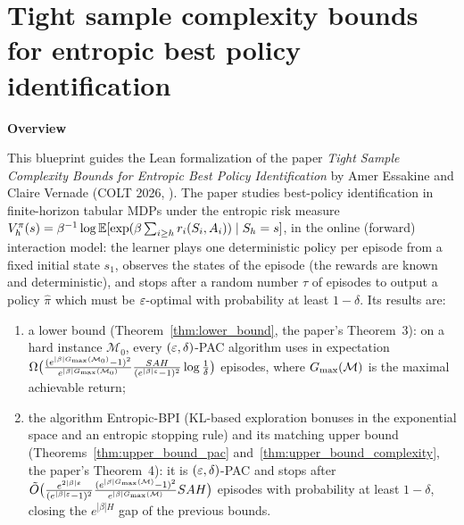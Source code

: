 %

\part{Tight sample complexity bounds for entropic best policy identification}
\label{part:main}

\textbf{Overview}

This blueprint guides the Lean formalization of the paper
\emph{Tight Sample Complexity Bounds for Entropic Best Policy Identification} by Amer Essakine
and Claire Vernade (COLT 2026, \cite{essakine2026tight}). The paper studies best-policy
identification in finite-horizon tabular MDPs under the entropic risk measure
$V^\pi_h(s) = \beta^{-1}\log \mathbb{E}[\exp(\beta \sum_{i \ge h} r_i(S_i, A_i)) \mid S_h = s]$, in the
online (forward) interaction model: the learner plays one deterministic policy per episode from
a fixed initial state $s_1$, observes the states of the episode (the rewards are known and
deterministic), and stops after a random number $\tau$ of episodes to output a policy
$\hat\pi$ which must be $\varepsilon$-optimal with probability at least $1 - \delta$. Its results are:
\begin{enumerate}
  \item[(i)] a lower bound (Theorem~\ref{thm:lower_bound}, the paper's Theorem~3): on a hard
        instance $\mathcal M_0$, every $(\varepsilon,\delta)$-PAC algorithm uses in expectation
        $\Omega\big(\frac{(e^{|\beta| G_{\max}(\mathcal M_0)} - 1)^2}{e^{|\beta| G_{\max}(\mathcal M_0)}}
        \frac{S A H}{(e^{|\beta|\varepsilon} - 1)^2} \log\frac1\delta\big)$ episodes, where
        $G_{\max}(\mathcal M)$ is the maximal achievable return;
  \item[(ii)] the algorithm Entropic-BPI (KL-based exploration bonuses in the exponential
        space and an entropic stopping rule) and its matching upper bound
        (Theorems~\ref{thm:upper_bound_pac} and~\ref{thm:upper_bound_complexity}, the paper's
        Theorem~4): it is $(\varepsilon,\delta)$-PAC and stops after
        $\tilde O\big(\frac{e^{2|\beta|\varepsilon}}{(e^{|\beta|\varepsilon} - 1)^2}
        \frac{(e^{|\beta| G_{\max}(\mathcal M)} - 1)^2}{e^{|\beta| G_{\max}(\mathcal M)}} S A H\big)$
        episodes with probability at least $1 - \delta$, closing the $e^{|\beta| H}$ gap of the
        previous bounds.
\end{enumerate}

